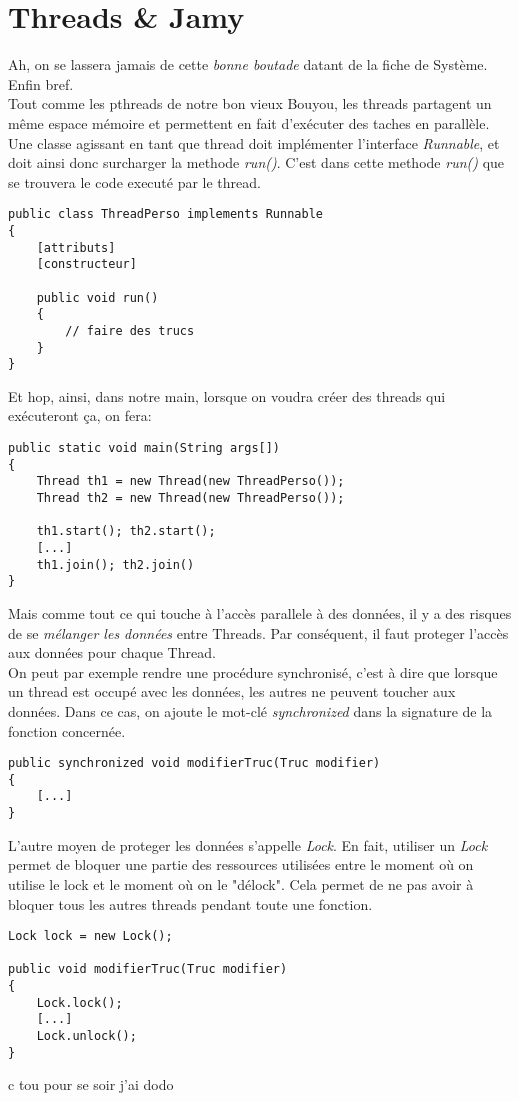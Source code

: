 \documentclass{article}
\begin{document}
\section{Threads \& Jamy}
Ah, on se lassera jamais de cette \emph{bonne boutade} datant de la fiche de Système. Enfin bref.\\
Tout comme les pthreads de notre bon vieux Bouyou, les threads partagent un même espace mémoire et permettent en fait d'exécuter des taches en parallèle.\\
Une classe agissant en tant que thread doit implémenter l'interface \emph{Runnable}, et doit ainsi donc surcharger la methode \emph{run()}. C'est dans cette methode \emph{run()} que se trouvera le code executé par le thread.\\
\begin{lstlisting}
public class ThreadPerso implements Runnable
{
	[attributs]
	[constructeur]
	
	public void run()
	{
		// faire des trucs
	} 
}
\end{lstlisting}
Et hop, ainsi, dans notre main, lorsque on voudra créer des threads qui exécuteront ça, on fera:
\begin{lstlisting}
public static void main(String args[])
{
	Thread th1 = new Thread(new ThreadPerso());
	Thread th2 = new Thread(new ThreadPerso());
	
	th1.start(); th2.start();
	[...]
	th1.join(); th2.join()
}
\end{lstlisting}
Mais comme tout ce qui touche à l'accès parallele à des données, il y a des risques de se \emph{mélanger les données} entre Threads. Par conséquent, il faut proteger l'accès aux données pour chaque Thread.\\
On peut par exemple rendre une procédure synchronisé, c'est à dire que lorsque un thread est occupé avec les données, les autres ne peuvent toucher aux données. Dans ce cas, on ajoute le mot-clé \emph{synchronized} dans la signature de la fonction concernée.
\begin{lstlisting}
public synchronized void modifierTruc(Truc modifier)
{
	[...]
}
\end{lstlisting}

L'autre moyen de proteger les données s'appelle \emph{Lock}. En fait, utiliser un \emph{Lock} permet de bloquer une partie des ressources utilisées entre le moment où on utilise le lock et le moment où on le "délock". Cela permet de ne pas avoir à bloquer tous les autres threads pendant toute une fonction.
\begin{lstlisting}
Lock lock = new Lock();

public void modifierTruc(Truc modifier)
{
	Lock.lock();
	[...]
	Lock.unlock();
}
\end{lstlisting}
c tou pour se soir j'ai dodo
\end{document}
